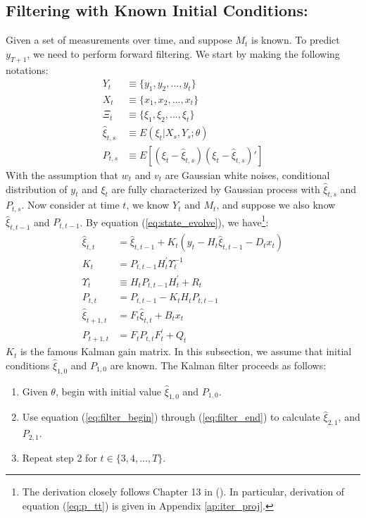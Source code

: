 \documentclass[12pt]{article}
\newenvironment{boenumerate}
    {\begin{enumerate}\renewcommand\labelenumi{\textbf\theenumi}}
    {\end{enumerate}}
\numberwithin{equation}{section}
\begin{document}
\subsection{Filtering with Known Initial Conditions:}
Given a set of measurements over time, and suppose $M_t$ is known. To predict $y_{T+1}$, we need to perform forward filtering. We start by making the following notations:
\begin{align*}
    Y_t &\equiv \{y_1, y_2, ..., y_t\} \\
    X_t &\equiv \{x_1, x_2, ..., x_t\} \\
    \Xi_t &\equiv \{\xi_1,\xi_2,...,\xi_t\} \\
    \hat{\xi}_{t,s} &\equiv E(\xi_t|X_{s},Y_{s};\theta) \\
    P_{t,s} &\equiv E[(\xi_t-\hat{\xi}_{t,s})(\xi_t-\hat{\xi}_{t,s})']
\end{align*}
With the assumption that $w_t$ and $v_t$ are Gaussian white noises, conditional distribution of $y_t$ and $\xi_t$ are fully characterized by Gaussian process with $\hat{\xi}_{t,s}$ and $P_{t,s}$. Now consider at time $t$, we know $Y_t$ and $M_t$, and suppose we also know $\hat{\xi}_{t,t-1}$ and $P_{t,t-1}$. By equation (\ref{eq:state_evolve}), we have\footnote{The derivation closely follows Chapter 13 in (\cite{hamilton_1994}). In particular, derivation of equation (\ref{eq:p_tt}) is given in Appendix \ref{ap:iter_proj}.}:
\begin{align}
    \hat{\xi}_{t,t} &= \hat{\xi}_{t,t-1} + K_t(y_t-H_t\hat{\xi}_{t,t-1}-D_tx_t) \label{eq:filter_begin} \\
    K_t &= P_{t,t-1}H_t^{'}\Upsilon_t^{-1} \label{eq:gain} \\
    \Upsilon_t &\equiv H_tP_{t,t-1}H_t^{'} + R_t \\
    P_{t,t} &= P_{t,t-1} - K_tH_tP_{t,t-1} \label{eq:p_tt} \\
    \hat{\xi}_{t+1,t} &= F_t\hat{\xi}_{t,t} + B_tx_t \label{eq:xi_t1} \\
    P_{t+1,t} &= F_tP_{t,t}F_t^{'}+Q_t \label{eq:filter_end}
\end{align}
$K_t$ is the famous Kalman gain matrix. In this subsection, we assume that initial conditions $\hat{\xi}_{1,0}$ and $P_{1,0}$ are known. The Kalman filter proceeds as follows:
\begin{boenumerate}
    \item Given $\theta$, begin with initial value $\hat{\xi}_{1,0}$ and $P_{1,0}$.
    \item Use equation (\ref{eq:filter_begin}) through (\ref{eq:filter_end}) to calculate $\hat{\xi}_{2,1}$, and $P_{2,1}$.
    \item Repeat step 2 for $t\in\{3, 4, ..., T\}$.
\end{boenumerate}
\end{document}
